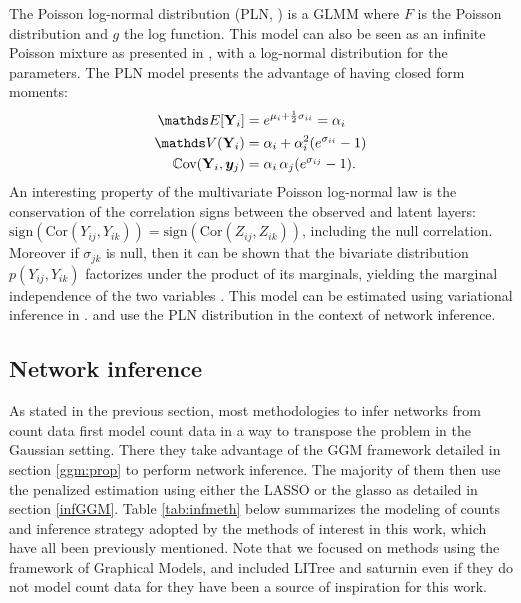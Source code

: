 The Poisson log-normal distribution (PLN, \citet{AiH89}) is a GLMM where $F$ is the Poisson distribution and $g$ the log function.  This model can also be seen as an infinite Poisson mixture as presented in \citet{inouye}, with a log-normal distribution for the parameters. The PLN model presents the advantage of having  closed form moments:
 \begin{align*}
 \Esp[\Yb_i] &= e^{\mu_i + \frac{1}{2} \sigma_{ii}} = \alpha_i\\
 \Var(\Yb_i) &=  \alpha_i+ \alpha_i^2(e^{\sigma_{ii}} -1)\\
 \Cov (\Yb_i, \yb_j) &=  \alpha_i\, \alpha_j (e^{\sigma_{ij}} -1).
 \end{align*}
An interesting property of the multivariate Poisson log-normal law is the conservation of the correlation signs between the observed and latent layers: $\text{sign}(\text{Cor}(Y_{ij}, Y_{ik})) = \text{sign}(\text{Cor}(Z_{ij}, Z_{ik}))$, including the null correlation. Moreover if $\sigma_{jk}$ is null, then it can be shown that the bivariate distribution $p(Y_{ij},Y_{ik})$ factorizes under the product of its marginals, yielding the marginal independence of the two variables \citep{AiH89}. This model can be  estimated using variational inference in \citet{CMR18}. \citet{MInt} and \citet{CMR19} use the PLN distribution in the context of network inference.
 
 \subsection{Network inference}
 
As stated in the previous section, most methodologies to infer networks from count data first model count data in a way to transpose the problem in the Gaussian setting. There they take advantage of the GGM framework detailed in section \ref{ggm:prop} to perform network inference. The majority of them then use the penalized estimation using either the LASSO or the glasso as detailed in section \ref{infGGM}. Table \ref{tab:infmeth} below summarizes the modeling of counts and inference strategy adopted by the methods of interest in this work, which have all been previously mentioned. Note that we focused on methods using the framework of Graphical Models, and included LITree and saturnin even if they do not model count data for they have been a source of inspiration for this work.\\

